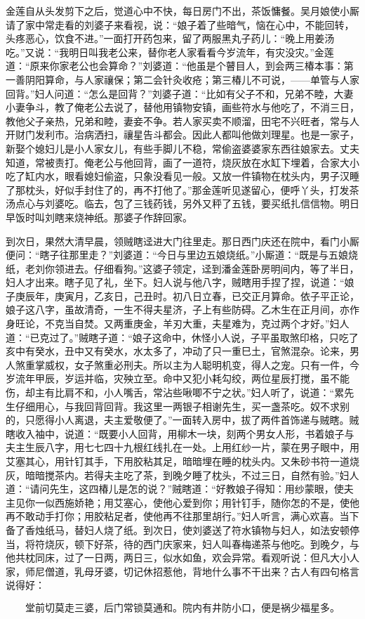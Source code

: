 金莲自从头发剪下之后，觉道心中不快，每日房门不出，茶饭慵餐。吴月娘使小厮请了家中常走看的刘婆子来看视，说：“娘子着了些暗气，恼在心中，不能回转，头疼恶心，饮食不进。”一面打开药包来，留了两服黑丸子药儿：“晚上用姜汤吃。”又说：“我明日叫我老公来，替你老人家看看今岁流年，有灾没灾。”金莲道：“原来你家老公也会算命？”刘婆道：“他虽是个瞽目人，到会两三椿本事：第一善阴阳算命，与人家禳保；第二会针灸收疮；第三椿儿不可说，——单管与人家回背。”妇人问道：“怎么是回背？”刘婆子道：“比如有父子不和，兄弟不睦，大妻小妻争斗，教了俺老公去说了，替他用镇物安镇，画些符水与他吃了，不消三日，教他父子亲热，兄弟和睦，妻妾不争。若人家买卖不顺溜，田宅不兴旺者，常与人开财门发利市。治病洒扫，禳星告斗都会。因此人都叫他做刘理星。也是一家子，新娶个媳妇儿是小人家女儿，有些手脚儿不稳，常偷盗婆婆家东西往娘家去。丈夫知道，常被责打。俺老公与他回背，画了一道符，烧灰放在水缸下埋着，合家大小吃了缸内水，眼看媳妇偷盗，只象没看见一般。又放一件镇物在枕头内，男子汉睡了那枕头，好似手封住了的，再不打他了。”那金莲听见遂留心，便呼丫头，打发茶汤点心与刘婆吃。临去，包了三钱药钱，另外又秤了五钱，要买纸扎信信物。明日早饭时叫刘瞎来烧神纸。那婆子作辞回家。

到次日，果然大清早晨，领贼瞎迳进大门往里走。那日西门庆还在院中，看门小厮便问：“瞎子往那里走？”刘婆道：“今日与里边五娘烧纸。”小厮道：“既是与五娘烧纸，老刘你领进去。仔细看狗。”这婆子领定，迳到潘金莲卧房明间内，等了半日，妇人才出来。瞎子见了礼，坐下。妇人说与他八字，贼瞎用手捏了捏，说道：“娘子庚辰年，庚寅月，乙亥日，己丑时。初八日立春，已交正月算命。依子平正论，娘子这八字，虽故清奇，一生不得夫星济，子上有些防碍。乙木生在正月间，亦作身旺论，不克当自焚。又两重庚金，羊刃大重，夫星难为，克过两个才好。”妇人道：“已克过了。”贼瞎子道：“娘子这命中，休怪小人说，子平虽取煞印格，只吃了亥中有癸水，丑中又有癸水，水太多了，冲动了只一重巳土，官煞混杂。论来，男人煞重掌威权，女子煞重必刑夫。所以主为人聪明机变，得人之宠。只有一件，今岁流年甲辰，岁运并临，灾殃立至。命中又犯小耗勾绞，两位星辰打搅，虽不能伤，却主有比肩不和，小人嘴舌，常沾些啾唧不宁之状。”妇人听了，说道：“累先生仔细用心，与我回背回背。我这里一两银子相谢先生，买一盏茶吃。奴不求别的，只愿得小人离退，夫主爱敬便了。”一面转入房中，拔了两件首饰递与贼瞎。贼瞎收入袖中，说道：“既要小人回背，用柳木一块，刻两个男女人形，书着娘子与夫主生辰八字，用七七四十九根红线扎在一处。上用红纱一片，蒙在男子眼中，用艾塞其心，用针钉其手，下用胶粘其足，暗暗埋在睡的枕头内。又朱砂书符一道烧灰，暗暗搅茶内。若得夫主吃了茶，到晚夕睡了枕头，不过三日，自然有验。”妇人道：“请问先生，这四椿儿是怎的说？”贼瞎道：“好教娘子得知：用纱蒙眼，使夫主见你一似西施娇艳；用艾塞心，使他心爱到你；用针钉手，随你怎的不是，使他再不敢动手打你；用胶粘足者，使他再不往那里胡行。”妇人听言，满心欢喜。当下备了香烛纸马，替妇人烧了纸。到次日，使刘婆送了符水镇物与妇人，如法安顿停当，将符烧灰，顿下好茶，待的西门庆家来，妇人叫春梅递茶与他吃。到晚夕，与他共枕同床，过了一日两，两日三，似水如鱼，欢会异常。看观听说：但凡大小人家，师尼僧道，乳母牙婆，切记休招惹他，背地什么事不干出来？古人有四句格言说得好：

\[
堂前切莫走三婆，后门常锁莫通和。
院内有井防小口，便是祸少福星多。
\]
